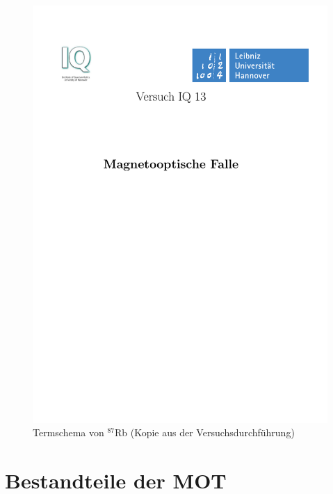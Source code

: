 \documentclass[12pt, a4paper]{article}
\begin{document}
  \begin{figure}[h!]
  \centering
  \includegraphics[page=10, width=\textwidth, trim=27mm 56mm 33mm 52mm, clip]{MOTDurchfuehrung.pdf}
  \caption{Termschema von ${}^{87}$Rb (Kopie aus der Versuchsdurchführung)}
  \label{rb}
  \end{figure}
\newpage
\section{Bestandteile der MOT}
\end{document}
